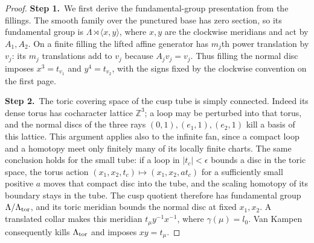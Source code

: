 \begin{proof}
\par\smallskip\noindent\textbf{Step 1.}\ We first derive the fundamental-group presentation from the fillings.
The smooth family over the punctured base has zero section, so its
fundamental group is $\Lambda\rtimes\langle x,y\rangle$, where
$x,y$ are the clockwise meridians and act by $A_1,A_2$.
On a finite filling the lifted affine generator has $m_j$th power
translation by $v_j$: its $m_j$ translations add to $v_j$ because
$A_jv_j=v_j$. Thus filling the normal disc imposes
$x^3=t_{v_1}$ and $y^4=t_{v_2}$, with the signs fixed by the
clockwise convention on the first page.

\par\smallskip\noindent\textbf{Step 2.}\ The toric covering space of the cusp tube is simply connected.
Indeed its dense torus has cocharacter lattice $\mathbb Z^3$; a loop may
be perturbed into that torus, and the normal discs of the three rays
$(0,1),(e_1,1),(e_2,1)$ kill a basis of this lattice.
This argument applies also to the infinite fan, since a compact loop
and a homotopy meet only finitely many of its locally finite charts.
The same conclusion holds for the small tube: if a loop in
$|t_c|<\epsilon$ bounds a disc in the toric space, the torus action
$(x_1,x_2,t_c)\mapsto(x_1,x_2,a t_c)$ for a sufficiently small
positive $a$ moves that compact disc into the tube, and the scaling
homotopy of its boundary stays in the tube.
The cusp quotient therefore has fundamental group
$\Lambda/\Lambda_{\rm tor}$, and its toric meridian bounds the
normal disc at fixed $x_1,x_2$. A translated collar makes this
meridian $t_\mu y^{-1}x^{-1}$, where $\gamma(\mu)=l_0$.
Van Kampen consequently kills $\Lambda_{\rm tor}$ and imposes
$xy=t_\mu$.


\end{proof}
